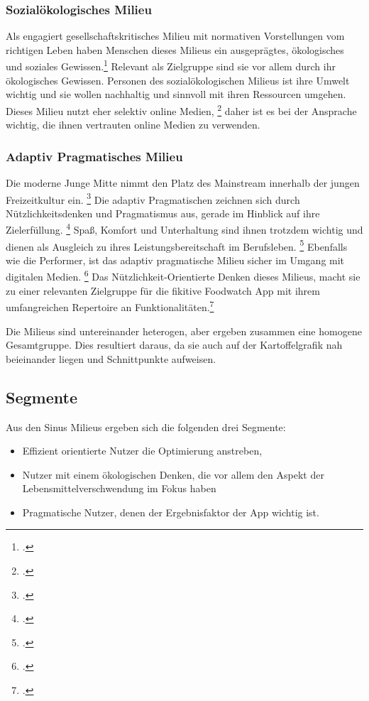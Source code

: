\subsubsection{Sozialökologisches Milieu}
Als engagiert gesellschaftskritisches Milieu mit normativen Vorstellungen vom richtigen Leben haben Menschen dieses Milieus ein ausgeprägtes, ökologisches und soziales Gewissen.\footcite[Vgl.][ ]{website:sinus-institut}
Relevant als Zielgruppe sind sie vor allem durch ihr ökologisches Gewissen. Personen des sozialökologischen Milieus ist ihre Umwelt wichtig und sie wollen nachhaltig und sinnvoll mit ihren Ressourcen umgehen. 
Dieses Milieu nutzt eher selektiv online Medien, \footcite[Vgl.][ ]{website:sinus-institut} daher ist es bei der Ansprache wichtig, die ihnen vertrauten online Medien zu verwenden.

\subsubsection{Adaptiv Pragmatisches Milieu}
Die moderne Junge Mitte nimmt den Platz des Mainstream innerhalb der jungen Freizeitkultur ein. \footcite[Vgl.][S. 37]{Barth2017} 
Die adaptiv Pragmatischen zeichnen sich durch Nützlichkeitsdenken und Pragmatismus aus, gerade im Hinblick auf ihre Zielerfüllung. \footcite[Vgl.][S. 37]{Barth2017} 
Spaß, Komfort und Unterhaltung sind ihnen trotzdem wichtig und dienen als Ausgleich zu ihres Leistungsbereitschaft im Berufsleben. \footcite[Vgl.][S. 37]{Barth2017}
Ebenfalls wie die Performer, ist das adaptiv pragmatische Milieu sicher im Umgang mit digitalen Medien. \footcite[Vgl.][ ]{website:sinus-institut}
Das Nützlichkeit-Orientierte Denken dieses Milieus, macht sie zu einer relevanten Zielgruppe für die fikitive Foodwatch App mit ihrem umfangreichen Repertoire an Funktionalitäten.\footcite[Vgl.][S. 36]{Barth2017} 

Die Milieus sind untereinander heterogen, aber ergeben zusammen eine homogene Gesamtgruppe. Dies resultiert daraus, da sie auch auf der Kartoffelgrafik nah beieinander liegen und Schnittpunkte aufweisen.

\subsection{Segmente}

Aus den Sinus Milieus ergeben sich die folgenden drei Segmente:
\begin{itemize}

\item  Effizient orientierte Nutzer die Optimierung anstreben,
\item Nutzer mit einem ökologischen Denken, die vor allem den Aspekt der Lebensmittelverschwendung im Fokus haben
\item  Pragmatische Nutzer, denen der Ergebnisfaktor der App wichtig ist.
\end{itemize}
